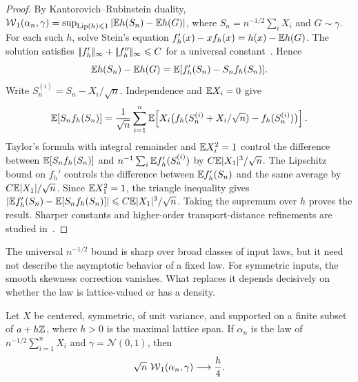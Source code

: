 \begin{proof}
	By Kantorovich--Rubinstein duality,
	$\operatorname{\mathcal{W}}_1(\alpha_n,\gamma)=\sup_{\operatorname{Lip}(h)\leqslant1}\left|\mathbb{E} h(S_n)-\mathbb{E} h(G)\right|$, where $S_n=n^{-1/2}\sum_i X_i$ and $G\sim\gamma$.
	For each such $h$, solve Stein's equation
	\(f_h'(x)-x f_h(x)=h(x)-\mathbb{E} h(G)\).
	The solution satisfies \(|\!| f_h' |\!|_\infty+|\!| f_h'' |\!|_\infty\leqslant C\) for a universal constant~\cite[Chapter~2]{chen2011normal}. Hence
	\[
		\mathbb{E} h(S_n)-\mathbb{E} h(G)=\mathbb{E}[f_h'(S_n)-S_nf_h(S_n)].
	\]
	Write \(S_n^{(i)}=S_n-X_i/\sqrt n\). Independence and \(\mathbb{E} X_i=0\) give
	\[
		\mathbb{E}[S_nf_h(S_n)]
		=
		\frac1{\sqrt n}\sum_{i=1}^n
		\mathbb{E}\!\left[X_i\big(f_h(S_n^{(i)}+X_i/\sqrt n)-f_h(S_n^{(i)})\big)\right].
	\]
	Taylor's formula with integral remainder and \(\mathbb{E} X_i^2=1\) control the difference between \(\mathbb{E}[S_nf_h(S_n)]\) and \(n^{-1}\sum_i\mathbb{E} f_h'(S_n^{(i)})\) by \(C\mathbb{E}|X_1|^3/\sqrt n\). The Lipschitz bound on \(f_h'\) controls the difference between \(\mathbb{E} f_h'(S_n)\) and the same average by \(C\mathbb{E}|X_1|/\sqrt n\). Since \(\mathbb{E} X_1^2=1\), the triangle inequality gives \(\left|\mathbb{E} f_h'(S_n)-\mathbb{E}[S_nf_h(S_n)]\right|\leqslant C\mathbb{E}|X_1|^3/\sqrt n\). Taking the supremum over \(h\) proves the result. Sharper constants and higher-order transport-distance refinements are studied in~\cite{bobkov2018berry,rio2011asymptotic}.
\end{proof}

The universal \(n^{-1/2}\) bound is sharp over broad classes of input laws, but it need not describe the asymptotic behavior of a fixed law. For symmetric inputs, the smooth skewness correction vanishes. What replaces it depends decisively on whether the law is lattice-valued or has a density.

\begin{prop}\label{prop-sharp-lattice-w1-clt}
	Let \(X\) be centered, symmetric, of unit variance, and supported on a finite subset of \(a+h\mathbb{Z}\), where \(h>0\) is the maximal lattice span. If \(\alpha_n\) is the law of \(n^{-1/2}\sum_{i=1}^nX_i\) and \(\gamma=\mathcal N(0,1)\), then
	\[
		\sqrt n\,\operatorname{\mathcal{W}}_1(\alpha_n,\gamma)\longrightarrow \frac h4.
	\]
\end{prop}

